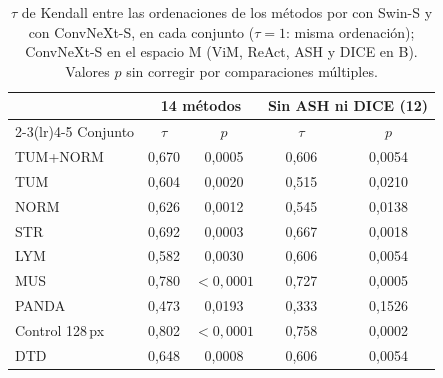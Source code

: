\begin{table}
\centering
\footnotesize
\setlength{\tabcolsep}{5pt}
\caption{$\tau$ de Kendall entre las ordenaciones de los métodos por \AUROC con Swin-S y con ConvNeXt-S, en cada conjunto ($\tau=1$: misma ordenación); ConvNeXt-S en el espacio M (ViM, ReAct, ASH y DICE en B). Valores $p$ sin corregir por comparaciones múltiples.}
\label{tab:convnext-kendall}
\begin{tabular*}{\linewidth}{@{\extracolsep{\fill}}lcccc}
\toprule
& \multicolumn{2}{c}{14 métodos} & \multicolumn{2}{c}{Sin ASH ni DICE (12)} \\
\cmidrule(lr){2-3}\cmidrule(lr){4-5}
Conjunto & $\tau$ & $p$ & $\tau$ & $p$ \\
\midrule
TUM+NORM & 0{,}670 & 0{,}0005 & 0{,}606 & 0{,}0054 \\
TUM & 0{,}604 & 0{,}0020 & 0{,}515 & 0{,}0210 \\
NORM & 0{,}626 & 0{,}0012 & 0{,}545 & 0{,}0138 \\
STR & 0{,}692 & 0{,}0003 & 0{,}667 & 0{,}0018 \\
LYM & 0{,}582 & 0{,}0030 & 0{,}606 & 0{,}0054 \\
MUS & 0{,}780 & $<0{,}0001$ & 0{,}727 & 0{,}0005 \\
PANDA & 0{,}473 & 0{,}0193 & 0{,}333 & 0{,}1526 \\
Control 128\,px & 0{,}802 & $<0{,}0001$ & 0{,}758 & 0{,}0002 \\
DTD & 0{,}648 & 0{,}0008 & 0{,}606 & 0{,}0054 \\
\bottomrule
\end{tabular*}
\end{table}

